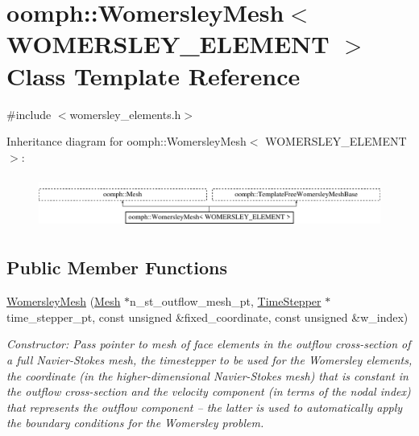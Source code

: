 \hypertarget{classoomph_1_1WomersleyMesh}{}\section{oomph\+:\+:Womersley\+Mesh$<$ W\+O\+M\+E\+R\+S\+L\+E\+Y\+\_\+\+E\+L\+E\+M\+E\+NT $>$ Class Template Reference}
\label{classoomph_1_1WomersleyMesh}


{\ttfamily \#include $<$womersley\+\_\+elements.\+h$>$}

Inheritance diagram for oomph\+:\+:Womersley\+Mesh$<$ W\+O\+M\+E\+R\+S\+L\+E\+Y\+\_\+\+E\+L\+E\+M\+E\+NT $>$\+:\begin{figure}[H]
\begin{center}
\leavevmode
\includegraphics[height=1.723077cm]{classoomph_1_1WomersleyMesh}
\end{center}
\end{figure}
\subsection*{Public Member Functions}
\begin{DoxyCompactItemize}
\item 
\hyperlink{classoomph_1_1WomersleyMesh_a1fc3a748ff68d01051759c9e3c39bca2}{Womersley\+Mesh} (\hyperlink{classoomph_1_1Mesh}{Mesh} $\ast$n\+\_\+st\+\_\+outflow\+\_\+mesh\+\_\+pt, \hyperlink{classoomph_1_1TimeStepper}{Time\+Stepper} $\ast$time\+\_\+stepper\+\_\+pt, const unsigned \&fixed\+\_\+coordinate, const unsigned \&w\+\_\+index)
\begin{DoxyCompactList}\small\item\em Constructor\+: Pass pointer to mesh of face elements in the outflow cross-\/section of a full Navier-\/\+Stokes mesh, the timestepper to be used for the Womersley elements, the coordinate (in the higher-\/dimensional Navier-\/\+Stokes mesh) that is constant in the outflow cross-\/section and the velocity component (in terms of the nodal index) that represents the outflow component -- the latter is used to automatically apply the boundary conditions for the Womersley problem. \end{DoxyCompactList}\end{DoxyCompactItemize}
